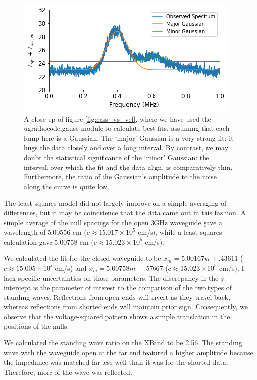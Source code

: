 \documentclass[12pt]{article}
\begin{document}
\begin{figure}
\centering
	\includegraphics[width=.6\linewidth]{gauss}
	\caption{A close-up of figure \ref{fig:cass_vs_vel}, where we have used the ugradiocode.gauss module to calculate best fits, assuming that each lump here is a Gaussian. The `major' Gaussian is a very strong fit: it hugs the data closely and over a long interval. By contrast, we may doubt the statistical significance of the `minor' Gaussian: the interval, over which the fit and the data align, is comparatively thin. Furthermore, the ratio of the Gaussian's amplitude to the noise along the curve is quite low.}
	\label{fig:gauss}
\end{figure}




The least-squares model did not largely improve on a simple averaging of differences, but it may be coincidence that the data came out in this fashion. A simple average of the null spacings for the open 3GHz waveguide gave a wavelength of 5.00556 cm ($c \approx 15.017 \times 10^5$ cm/s), while a least-squares calculation gave 5.00758 cm ($c \approx 15.023 \times 10^5$ cm/s).

We calculated the fit for the closed waveguide to be $x_m = 5.00167 m + .43611$ ($c \approx 15.005 \times 10^5$ cm/s) and $x_m = 5.00758 m - .57667$ ($c \approx 15.023 \times 10^5$ cm/s). I lack specific uncertainties on those parameters. The discrepancy in the y-intercept is the parameter of interest to the comparison of the two types of standing waves. Reflections from open ends will invert as they travel back, whereas reflections from shorted ends will maintain prior sign. Consequently, we observe that the voltage-squared pattern shows a simple translation in the positions of the nulls.

We calculated the standing wave ratio on the XBand to be 2.56. The standing wave with the waveguide open at the far end featured a higher amplitude because the impedance was matched far less well than it was for the shorted data. Therefore, more of the wave was reflected.
\end{document}
